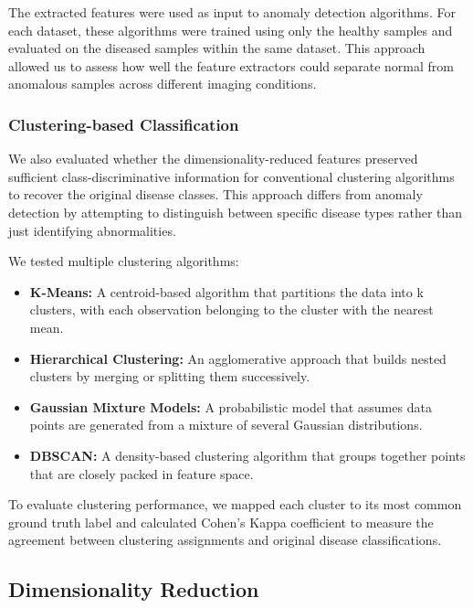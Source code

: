 \documentclass[12pt,a4paper,oneside]{report}
\begin{document}
The extracted features were used as input to anomaly detection algorithms. For each dataset, these algorithms were trained using only the healthy samples and evaluated on the diseased samples within the same dataset. This approach allowed us to assess how well the feature extractors could separate normal from anomalous samples across different imaging conditions.

\subsubsection{Clustering-based Classification}

We also evaluated whether the dimensionality-reduced features preserved sufficient class-discriminative information for conventional clustering algorithms to recover the original disease classes. This approach differs from anomaly detection by attempting to distinguish between specific disease types rather than just identifying abnormalities.

We tested multiple clustering algorithms:
\begin{itemize}
    \item \textbf{K-Means:} A centroid-based algorithm that partitions the data into k clusters, with each observation belonging to the cluster with the nearest mean.
    
    \item \textbf{Hierarchical Clustering:} An agglomerative approach that builds nested clusters by merging or splitting them successively.
    
    \item \textbf{Gaussian Mixture Models:} A probabilistic model that assumes data points are generated from a mixture of several Gaussian distributions.
    
    \item \textbf{DBSCAN:} A density-based clustering algorithm that groups together points that are closely packed in feature space.
\end{itemize}

To evaluate clustering performance, we mapped each cluster to its most common ground truth label and calculated Cohen's Kappa coefficient to measure the agreement between clustering assignments and original disease classifications.

\subsection{Dimensionality Reduction}
\end{document}
